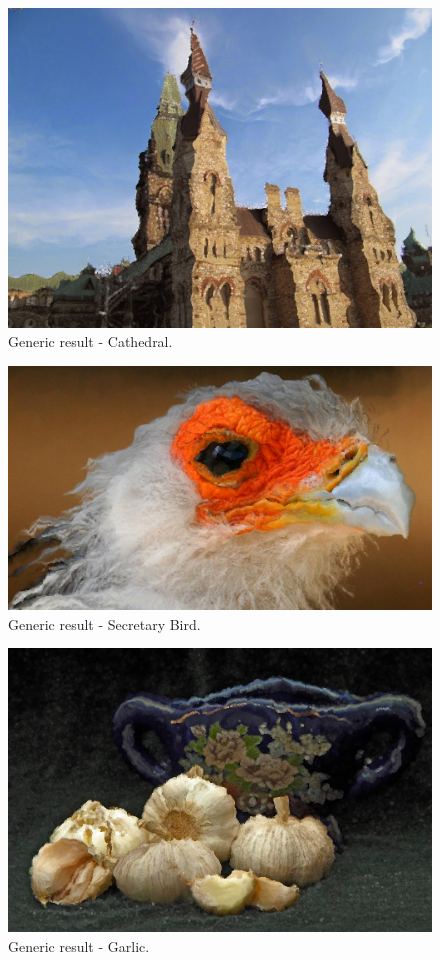  



\begin{figure}
\includegraphics[width=5.5in]{images/generic-cathedral.jpg}
\caption{Generic result - Cathedral.}    \label{fig:generic-cathedral}
\end{figure}
\begin{figure}
\includegraphics[width=5.9in]{images/generic-bird.jpg}
\caption{Generic result - Secretary Bird.}    
\end{figure}
\begin{figure}
\includegraphics[width=5.9in]{images/generic-garlic.jpg}
\caption{Generic result - Garlic.}    
\end{figure}
